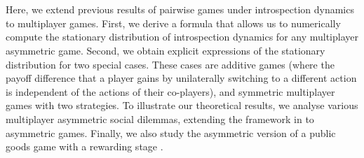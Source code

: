 \documentclass[11pt]{article}
\theoremstyle{plainCl1}
\theoremstyle{plainCl2}
\begin{document}
\\ \\
\noindent Here, we extend previous results of pairwise games under introspection dynamics to multiplayer games. 
First, we derive a formula that allows us to numerically compute the stationary distribution of introspection dynamics for any multiplayer asymmetric game. 
Second, we obtain explicit expressions of the stationary distribution for two special cases. These cases are additive games (where the payoff difference that a player gains by unilaterally switching to a different action is independent of the actions of their co-players), and symmetric multiplayer games with two strategies. 
To illustrate our theoretical results, we analyse various multiplayer asymmetric social dilemmas, extending the framework in \cite{Hauert:JTB:2006a} to asymmetric games. Finally, we also study the asymmetric version of a public goods game with a rewarding stage \cite{Pal:NatCom:2022}.
\end{document}
